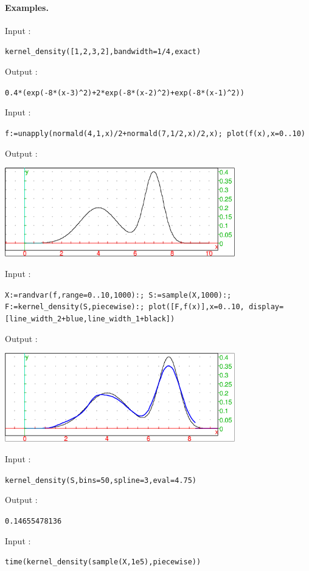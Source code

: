 \documentclass[a4paper,11pt]{book}
\begin{document}
\paragraph{Examples.}
Input :
\begin{center}
  \tt kernel\_density([1,2,3,2],bandwidth=1/4,exact)
\end{center}
Output :
\begin{center}
  \tt 0.4*(exp(-8*(x-3)\verb|^|2)+2*exp(-8*(x-2)\verb|^|2)+exp(-8*(x-1)\verb|^|2))
\end{center}
Input :
\begin{center}
  \tt f:=unapply(normald(4,1,x)/2+normald(7,1/2,x)/2,x); plot(f(x),x=0..10)
\end{center}
Output :
\begin{center}
  \includegraphics[width=0.75\textwidth]{kde_plot1.png}
\end{center}
Input :
\begin{center}
  \tt X:=randvar(f,range=0..10,1000):; S:=sample(X,1000):; F:=kernel\_density(S,piecewise):; plot([F,f(x)],x=0..10, display=[line\_width\_2+blue,line\_width\_1+black])
\end{center}
Output :
\begin{center}
  \includegraphics[width=0.75\textwidth]{kde_plot2.png}
\end{center}
Input :
\begin{center}
  \tt kernel\_density(S,bins=50,spline=3,eval=4.75)
\end{center}
Output :
\begin{center}
  \tt 0.14655478136
\end{center}
Input :
\begin{center}
  \tt time(kernel\_density(sample(X,1e5),piecewise))
\end{center}
\end{document}
